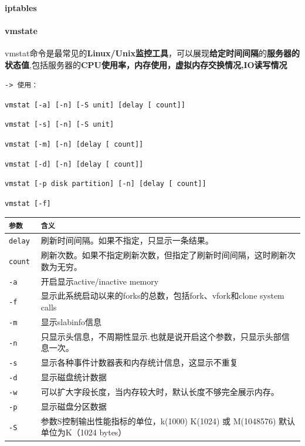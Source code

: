 \documentclass[UTF8,a4paper,12pt]{ctexbook}
\begin{document}
			\paragraph{iptables}
			
			\paragraph{vmstate} vmstat命令是最常见的\textbf{Linux/Unix监控工具}，可以展现\textbf{给定时间间隔}的\textbf{服务器的状态值},包括服务器的\textbf{CPU使用率，内存使用，虚拟内存交换情况,IO读写情况}
			
			\verb|-> 使用：|
			
			\verb|vmstat [-a] [-n] [-S unit] [delay [ count]]|
			
			\verb|vmstat [-s] [-n] [-S unit]|
			
			\verb|vmstat [-m] [-n] [delay [ count]]|
			
			\verb|vmstat [-d] [-n] [delay [ count]]|
			
			\verb|vmstat [-p disk partition] [-n] [delay [ count]]|
			
			\verb|vmstat [-f]|
			
			
			\begin{table}[H]
				\centering
				\begin{tabular}{l|m{14cm}}
					\hline
					\verb|参数 |   	   & \verb|含义| \\
					\hline
					\verb|delay |      & 刷新时间间隔。如果不指定，只显示一条结果。	\\
					\verb|count |      & 刷新次数。如果不指定刷新次数，但指定了刷新时间间隔，这时刷新次数为无穷。	\\
					\verb|-a |   	   & 开启显示active/inactive memory	\\
					\verb|-f |   	   & 显示此系统启动以来的forks的总数，包括fork、vfork和clone system calls	\\
					\verb|-m |   	   & 显示slabinfo信息	\\
					\verb|-n |   	   & 只显示头信息，不周期性显示.也就是说开启这个参数，只显示头部信息一次。	\\
					\verb|-s |   	   & 显示各种事件计数器表和内存统计信息，这显示不重复	\\
					\verb|-d |   	   & 显示磁盘统计数据	\\
					\verb|-w |   	   & 可以扩大字段长度，当内存较大时，默认长度不够完全展示内存。	\\
					\verb|-p |   	   & 显示磁盘分区数据	\\
					\verb|-S |   	   & 参数S控制输出性能指标的单位，k(1000) K(1024) 或 M(1048576) 默认单位为K（1024 bytes）	\\
					\hline
				\end{tabular}
			\end{table}	
			
\end{document}
